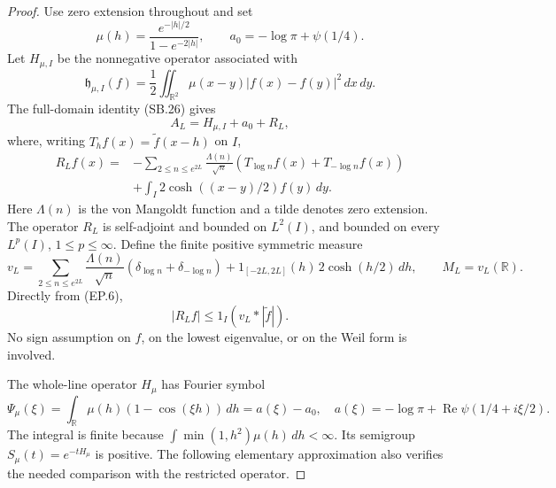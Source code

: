 \begin{proof}
Use zero extension throughout and set
\[
 \mu(h)=\frac{e^{-|h|/2}}{1-e^{-2|h|}},\qquad
 a_0=-\log\pi+\psi(1/4).
\]
Let \(H_{\mu,I}\) be the nonnegative operator associated with
\[
 \mathfrak h_{\mu,I}(f)=\frac12
       \iint_{\mathbb R^2}\mu(x-y)|f(x)-f(y)|^2\,dx\,dy.
                                                        \tag{EP.4}
\]
The full-domain identity (SB.26) gives
\[
                      A_L=H_{\mu,I}+a_0+R_L,          \tag{EP.5}
\]
where, writing \(T_hf(x)=\widetilde f(x-h)\) on \(I\),
\[
 \begin{split}
 R_Lf(x)={}&-\sum_{2\leq n\leq e^{2L}}
       \frac{\Lambda(n)}{\sqrt n}
           (T_{\log n}f(x)+T_{-\log n}f(x))\\
 &+\int_I 2\cosh((x-y)/2)f(y)\,dy .
 \end{split}                                           \tag{EP.6}
\]
Here \(\Lambda(n)\) is the von Mangoldt function and a tilde
denotes zero extension.  The operator \(R_L\) is self-adjoint
and bounded on \(L^2(I)\), and bounded on every \(L^p(I)\),
\(1\leq p\leq\infty\).  Define the finite positive symmetric
measure
\[
 v_L=\sum_{2\leq n\leq e^{2L}}
       \frac{\Lambda(n)}{\sqrt n}
          (\delta_{\log n}+\delta_{-\log n})
       +1_{[-2L,2L]}(h)\,2\cosh(h/2)\,dh,
 \qquad M_L=v_L(\mathbb R).
                                                        \tag{EP.7}
\]
Directly from (EP.6),
\[
                    |R_Lf|\leq 1_I(v_L*|\widetilde f|).
                                                        \tag{EP.8}
\]
No sign assumption on \(f\), on the lowest eigenvalue, or
on the Weil form is involved.

The whole-line operator \(H_\mu\) has Fourier symbol
\[
 \Psi_\mu(\xi)=\int_{\mathbb R}
            \mu(h)(1-\cos(\xi h))\,dh
       =a(\xi)-a_0,\quad
 a(\xi)=-\log\pi+
        \operatorname{Re}\psi(1/4+i\xi/2).
                                                        \tag{EP.9}
\]
The integral is finite because
\(\int\min(1,h^2)\mu(h)\,dh<\infty\).
Its semigroup \(S_\mu(t)=e^{-tH_\mu}\) is positive.
The following elementary approximation also verifies
the needed comparison with the restricted operator.


\end{proof}
